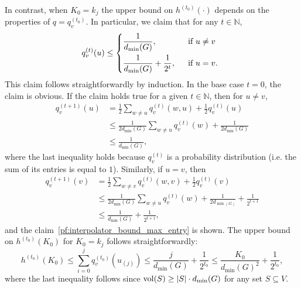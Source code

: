 	In contrast, when $K_0 = k_j$ the upper bound on $h^{(t_0)}(\cdot)$ depends on the properties of $q = q_v^{(t_0)}$. In particular, we claim that for any $t \in \mathbb{N}$,
	\begin{equation}
	\label{pf:interpolator_bound_max_entry}
	q_v^{(t)}(u) \leq
	\begin{dcases*}
	\frac{1}{d_{\min}(G)},& ~~\textrm{if $u \neq v$} \\
	\frac{1}{d_{\min}(G)} + \frac{1}{2^t},& ~~\textrm{if $u = v$.}
	\end{dcases*}
	\end{equation}
	This claim follows straightforwardly by induction. In the base case $t = 0$, the claim is obvious. If the claim holds true for a given $t \in \mathbb{N}$, then for $u \neq v$,
	\begin{equation}
	\label{pf:interpolator_bound_max_entry_inductive_step}
	\begin{aligned}
	q_v^{(t + 1)}(u) & = \frac{1}{2}\sum_{w \neq u}q_v^{(t)}(w,u)  + \frac{1}{2}q_v^{(t)}(u) \\
	& \leq \frac{1}{2d_{\min}(G)}\sum_{w \neq u}q_v^{(t)}(w)  + \frac{1}{2d_{\min}(G)} \\
	& \leq \frac{1}{d_{\min}(G)},
	\end{aligned}
	\end{equation}
	where the last inequality holds because $q_v^{(t)}$ is a probability distribution (i.e. the sum of its entries is equal to $1$). Similarly, if $u = v$, then
	\begin{align*}
	q_v^{(t + 1)}(v) & = \frac{1}{2}\sum_{w \neq v}q_v^{(t)}(w,v)  + \frac{1}{2}q_v^{(t)}(v) \\
	& \leq \frac{1}{2d_{\min}(G)}\sum_{w \neq u}q_v^{(t)}(w)  + \frac{1}{2d_{\min(G)}} + \frac{1}{2^{t + 1}} \\
	& \leq \frac{1}{d_{\min}(G)} + \frac{1}{2^{t + 1}},
	\end{align*}
	and the claim~\eqref{pf:interpolator_bound_max_entry} is shown. The upper bound on $h^{(t_0)}(K_0)$ for $K_0 = k_j$ follows straightforwardly:
	\begin{equation*}
	h^{(t_0)}(K_0) \leq \sum_{i = 0}^{j} q_v^{(t_0)}(u_{(j)}) \leq \frac{j}{d_{\min}(G)} + \frac{1}{2^{t_0}} \leq \frac{K_0}{d_{\min}(G)^2} + \frac{1}{2^{t_0}},
	\end{equation*}
	where the last inequality follows since $\mathrm{vol}(S) \geq |S| \cdot d_{\min}(G)$ for any set $S \subseteq V$. 

